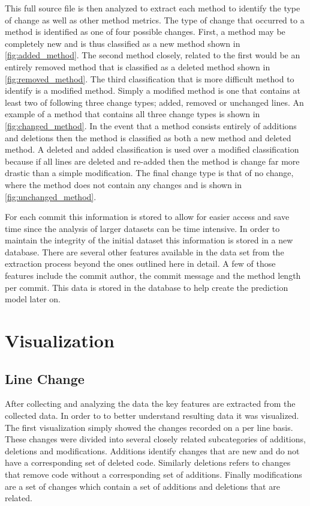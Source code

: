 This full source file is then analyzed to extract each method to identify the type of change as well as other method metrics. The type of change that occurred to a method is identified as one of four possible changes. First, a method may be completely new and is thus classified as a new method shown in \autoref{fig:added_method}. The second method closely, related to the first would be an entirely removed method that is classified as a deleted method shown in \autoref{fig:removed_method}. The third classification that is more difficult method to identify is a modified method. Simply a modified method is one that contains at least two of following three change types; added, removed or unchanged lines. An example of a method that contains all three change types is shown in \autoref{fig:changed_method}. In the event that a method consists entirely of additions and deletions then the method is classified as both a new method and deleted method. A deleted and added classification is used over a modified classification because if all lines are deleted and re-added then the method is change far more drastic than a simple modification. The final change type is that of no change, where the method does not contain any changes and is shown in \autoref{fig:unchanged_method}.

For each commit this information is stored to allow for easier access and save time since the analysis of larger datasets can be time intensive. In order to maintain the integrity of the initial dataset this information is stored in a new database. There are several other features available in the data set from the extraction process beyond the ones outlined here in detail. A few of those features include the commit author, the commit message and the method length per commit. This data is stored in the database to help create the prediction model later on.

\section{Visualization}

\subsection{Line Change}
\label{subsec:line_change}

After collecting and analyzing the data the key features are extracted from the collected data. In order to to better understand resulting data it was visualized. The first visualization simply showed the changes recorded on a per line basis. These changes were divided into several closely related subcategories of additions, deletions and modifications. Additions identify changes that are new and do not have a corresponding set of deleted code. Similarly deletions refers to changes that remove code without a corresponding set of additions. Finally modifications are a set of changes which contain a set of additions and deletions that are related.

